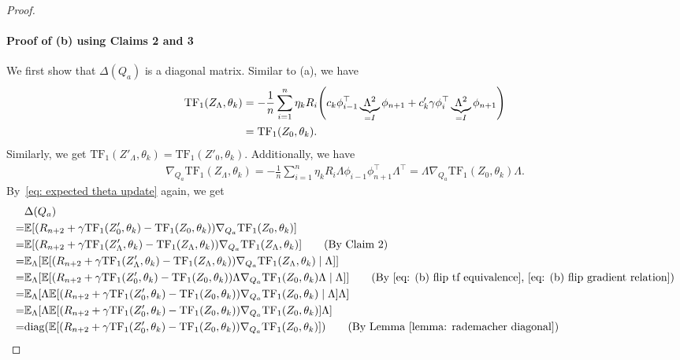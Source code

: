 \documentclass{article}
\newcommand{\explain}[1]{\tag*{(#1)}}
\newcommand{\E}{\mathbb{E}}
\newcommand{\tf}{\text{TF}}
\newcommand{\diag}{\text{diag}}
\begin{document}
\begin{proof}
\paragraph{Proof of (b) using Claims 2 and 3}
We first show that $\Delta (Q_a)$ is a diagonal matrix.
Similar to (a), we have
\begin{align}
\label{eq: (b) flip tf equivalence}
    \tf_1(Z_\Lambda,\theta_k)
    &= -\frac{1}{n}\sum_{i=1}^n  \eta_k R_i \qty(c_k  \phi_{i-1}^\top \underbrace{\Lambda^2}_{= I} \phi_{n+1} + c_k' \gamma  \phi_{i}^\top \underbrace{\Lambda^2}_{= I} \phi_{n+1})\\
    &= \tf_1(Z_0,\theta_k).
\end{align}
Similarly, we get $\tf_1(Z'_\Lambda,\theta_k) = \tf_1(Z'_0,\theta_k)$.
Additionally, we have
\begin{align}
\label{eq: (b) flip gradient relation}
    \nabla_{Q_a} \tf_1(Z_\Lambda,\theta_k)
    = -\frac{1}{n}\sum_{i=1}^n \eta_k R_i  \Lambda \phi_{i-1} \phi_{n+1}^\top  \Lambda^\top
    = \Lambda \nabla_{Q_a} \tf_1(Z_0, \theta_k) \Lambda.
\end{align}
By~\eqref{eq: expected theta update} again, we get
\begin{align}
     & \Delta(Q_a)\\
    =& \E\qty[(R_{n+2} + \gamma \tf_1(Z'_0, \theta_k) - \tf_1(Z_0, \theta_k))\nabla_{Q_a}\tf_1(Z_0, \theta_k)]\\
    =& \E\qty[(R_{n+2} + \gamma \tf_1(Z'_\Lambda, \theta_k) - \tf_1(Z_\Lambda, \theta_k))\nabla_{Q_a} \tf_1(Z_\Lambda, \theta_k)]\explain{By Claim 2}\\
    =& \E_\Lambda\qty[\E\qty[(R_{n+2} + \gamma \tf_1(Z'_\Lambda, \theta_k) - \tf_1(Z_\Lambda, \theta_k))\nabla_{Q_a}\tf_1(Z_\Lambda, \theta_k) \mid \Lambda]]\\
    =& \E_\Lambda\qty[\E\qty[(R_{n+2} + \gamma \tf_1(Z'_0, \theta_k) - \tf_1(Z_0, \theta_k))\Lambda \nabla_{Q_a}\tf_1(Z_0, \theta_k)\Lambda \mid \Lambda]] \explain{By \eqref{eq: (b) flip tf equivalence}, \eqref{eq: (b) flip gradient relation}}\\
    =& \E_\Lambda\qty[\Lambda \E\qty[(R_{n+2} + \gamma \tf_1(Z'_0, \theta_k) - \tf_1(Z_0, \theta_k)) \nabla_{Q_a}\tf_1(Z_0, \theta_k) \mid \Lambda]\Lambda]\\
    =& \E_\Lambda\qty[\Lambda \E\qty[(R_{n+2} + \gamma \tf_1(Z'_0, \theta_k) - \tf_1(Z_0, \theta_k)) \nabla_{Q_a}\tf_1(Z_0, \theta_k)]\Lambda]\\
    =& \diag\qty(\E\qty[(R_{n+2} + \gamma \tf_1(Z'_0, \theta_k) - \tf_1(Z_0, \theta_k))\nabla_{Q_a}\tf_1(Z_0, \theta_k)])\explain{By Lemma~\ref{lemma: rademacher diagonal}}\\

\end{align}
\end{proof}
\end{document}
